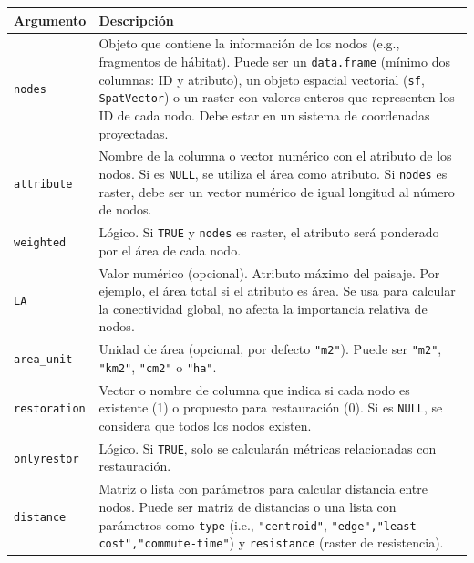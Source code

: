 \documentclass[
]{book}
\begin{document}
\begin{longtable}[]{@{}
  >{\raggedright\arraybackslash}p{}
  >{\raggedright\arraybackslash}p{}@{}}
\toprule\noalign{}
\begin{minipage}[b]{\linewidth}\raggedright
Argumento
\end{minipage} & \begin{minipage}[b]{\linewidth}\raggedright
Descripción
\end{minipage} \\
\midrule\noalign{}
\endhead
\bottomrule\noalign{}
\endlastfoot
\texttt{nodes} & Objeto que contiene la información de los nodos (e.g., fragmentos de hábitat). Puede ser un \texttt{data.frame} (mínimo dos columnas: ID y atributo), un objeto espacial vectorial (\texttt{sf}, \texttt{SpatVector}) o un raster con valores enteros que representen los ID de cada nodo. Debe estar en un sistema de coordenadas proyectadas. \\
\texttt{attribute} & Nombre de la columna o vector numérico con el atributo de los nodos. Si es \texttt{NULL}, se utiliza el área como atributo. Si \texttt{nodes} es raster, debe ser un vector numérico de igual longitud al número de nodos. \\
\texttt{weighted} & Lógico. Si \texttt{TRUE} y \texttt{nodes} es raster, el atributo será ponderado por el área de cada nodo. \\
\texttt{LA} & Valor numérico (opcional). Atributo máximo del paisaje. Por ejemplo, el área total si el atributo es área. Se usa para calcular la conectividad global, no afecta la importancia relativa de nodos. \\
\texttt{area\_unit} & Unidad de área (opcional, por defecto \texttt{"m2"}). Puede ser \texttt{"m2"}, \texttt{"km2"}, \texttt{"cm2"} o \texttt{"ha"}. \\
\texttt{restoration} & Vector o nombre de columna que indica si cada nodo es existente (1) o propuesto para restauración (0). Si es \texttt{NULL}, se considera que todos los nodos existen. \\
\texttt{onlyrestor} & Lógico. Si \texttt{TRUE}, solo se calcularán métricas relacionadas con restauración. \\
\texttt{distance} & Matriz o lista con parámetros para calcular distancia entre nodos. Puede ser matriz de distancias o una lista con parámetros como \texttt{type} (i.e., \texttt{"centroid"}, \texttt{"edge",\textasciigrave{}\textasciigrave{}"least-cost",\textasciigrave{}\textasciigrave{}"commute-time"}) y \texttt{resistance} (raster de resistencia). \\

\end{longtable}
\end{document}
